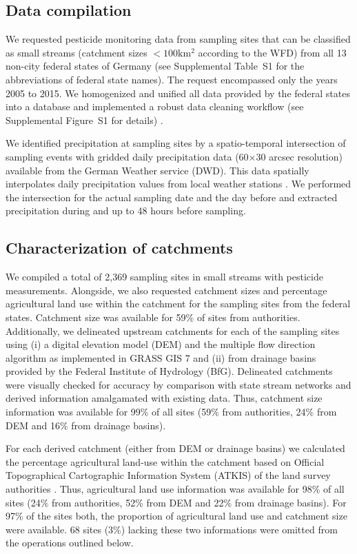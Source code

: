 \documentclass[journal=esthag,manuscript=article]{achemso}
\begin{document}
\subsection{Data compilation}
We requested pesticide monitoring data from sampling sites that can be classified as small streams (catchment sizes $\mathrm{< 100km^2}$ according to the WFD) from all 13 non-city federal states of Germany (see Supplemental Table~S1 for the abbreviations of federal state names). 
The request encompassed only the years 2005 to 2015.
We homogenized and unified all data provided by the federal states into a database and implemented a robust data cleaning workflow (see Supplemental Figure~S1 for details) \citep{poisot_best_2015}.

We identified precipitation at sampling sites by a spatio-temporal intersection of sampling events with gridded daily precipitation data (60$\times$30 arcsec resolution) available from the German Weather service (DWD).
This data spatially interpolates daily precipitation values from local weather stations \citep{rauthe_central_2013}. 
We performed the intersection for the actual sampling date and the day before and extracted precipitation during and up to 48 hours before sampling. 


\subsection{Characterization of catchments}
We compiled a total of 2,369 sampling sites in small streams with pesticide measurements. %
Alongside, we also requested catchment sizes and percentage agricultural land use within the catchment for the sampling sites from the federal states. %
Catchment size was available for 59\% of sites from authorities. 
Additionally, we delineated upstream catchments for each of the sampling sites using (i) a digital elevation model (DEM) \citep{eea_digital_2013} and the multiple flow direction algorithm \citep{holmgren_multiple_1994} as implemented in GRASS GIS 7 \citep{neteler_grass_2012} and (ii) from drainage basins provided by the Federal Institute of Hydrology (BfG).
Delineated catchments were visually checked for accuracy by comparison with state stream networks and derived information amalgamated with existing data.
Thus, catchment size information was available for 99\% of all sites (59\% from authorities, 24\% from DEM and 16\% from drainage basins). 

For each derived catchment (either from DEM or drainage basins) we calculated the percentage agricultural land-use within the catchment based on Official Topographical Cartographic Information System (ATKIS) of the land survey authorities \citep{adv_atkis_2016}. 
Thus, agricultural land use information was available for 98\% of all sites (24\% from authorities, 52\% from DEM and 22\% from drainage basins). 
For 97\% of the sites both, the proportion of agricultural land use and catchment size were available. 
68 sites (3\%) lacking these two informations were omitted from the operations outlined below.
\end{document}
